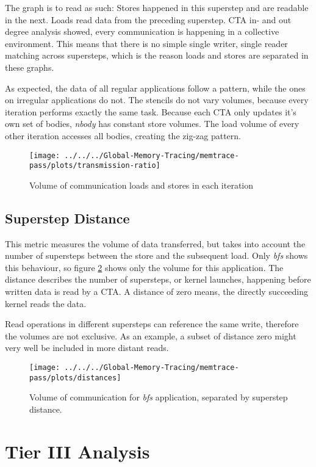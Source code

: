 The graph is to read as such: Stores happened in this superstep and are readable in the next. Loads read data from the preceding superstep. CTA in- and out degree analysis showed, every communication is happening in a collective environment. This means that there is no simple single writer, single reader matching across supersteps, which is the reason loads and stores are separated in these graphs.

As expected, the data of all regular applications follow a pattern, while the ones on irregular applications do not. The stencils do not
vary volumes, because every iteration performs exactly the same task. Because each CTA only updates
it's own set of bodies, \textit{nbody} has constant store volumes. The load volume of every other iteration accesses all bodies, creating the zig-zag pattern.
\begin{figure}[h!]
	\centering
	\texttt{[image: ../../../Global-Memory-Tracing/memtrace-pass/plots/transmission-ratio]}
	\caption{Volume of communication loads and stores in each iteration}
	\label{trans-ratio}
\end{figure}
\subsection{Superstep Distance}
This metric measures the volume of data transferred, but takes into account the number of supersteps between the store and the subsequent load. Only \textit{bfs} shows this behaviour, so
figure \ref{trans-distance} shows only the volume for this application. The distance describes the number
of supersteps, or kernel launches, happening before written data is read by a CTA. A distance of zero means, the directly succeeding kernel reads the data.

Read operations in different supersteps can reference the same write, therefore the volumes are not exclusive.
As an example, a subset of distance zero might very well be included in more distant reads.
\begin{figure}[t]
	\centering
	\texttt{[image: ../../../Global-Memory-Tracing/memtrace-pass/plots/distances]}
	\caption{Volume of communication for \textit{bfs} application, separated by superstep distance.}
	\label{trans-distance}
\end{figure}
\section{Tier III Analysis}

